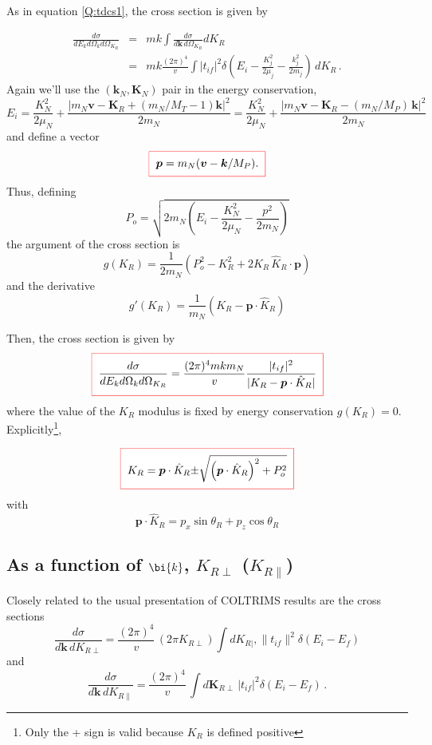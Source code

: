 As in equation \ref{Q:tdcs1}, the cross section is given by

\begin{eqnarray} \label{Q:tdcs2}
\frac{d\sigma}{d E_{k} d\Omega_{k}d \Omega_{K_{R}}} &=& m k
\int
\frac{d\sigma}{d \bm{k} \, d \Omega_{K_{R}} } d K_{R} \\
&=& m k \frac{(2 \pi)^{4}}{v}\int | t_{if}| ^{2}
\delta\left(E_{i} - \frac{K^{2}_{j}} {2 \mu_{j} } - \frac{k^{2}_{j}}{2
m_{j} }\right) \, d K_{R} \, . \nonumber
\end{eqnarray}
%
Again we'll use the $(\bm{k}_N,\bm{K}_N)$ pair in the energy
conservation,
$$
E_{i} = \frac{K^{2}_{N}} {2 \mu_{N} } + \frac{\left| m_N \bm{v} -
\bm{K}_R + (m_N/M_T -1) \bm{k} \right|^{2}}{2 m_N } = \frac{K^{2}_{N}}
{2 \mu_{N} } + \frac{\left| m_N \bm{v} - \bm{K}_R - (m_N/M_P)\, \bm{k}
\right| ^{2}}{2 m_N }
$$
%
and define a vector
$$
\fbeq{\bm{p}=m_{N}(\bm{v} - \bm{k}/M_P).}
$$
%
Thus, defining
$$
P_o = \sqrt{{2 m_N} \left( E_{i} - \frac{K^{2}_{N}} {2 \mu_{N} }-
\frac{p^{2}}{2 m_{N}} \right)}
$$
the argument of the cross section is
$$
g(K_{R}) = \frac{1}{2 m_{N}} \left( P_o^{2} - K_{R}^{2} + 2 K_{R} \,
\hat{K}_{R} \cdot \bm{p} \right)
$$
and the derivative
$$
g'(K_{R}) = \frac{1}{m_{N}} \left(K_{R} - \bm{p} \cdot \hat{K}_{R}
\right)
$$

Then, the cross section is given by
\begin{equation}\label{Q:5xsEkWkWR}
  \fbeq{
\frac{d\sigma}{d E_{k} d\Omega_{k}d \Omega_{K_{R}}} =
\frac{(2 \pi)^{4} m k m_N}{v } \frac{ | t_{if}| ^{2}}{|  K_{R}
- \bm{p} \cdot \hat{K}_{R} | }
    }
\end{equation}
%
where the value of the $K_{R}$ modulus is fixed by energy conservation
$g(K_{R})=0$. Explicitly\footnote{Only the + sign is valid because
$K_{R}$ is defined positive},

\begin{equation}\label{Q:KR-k}
  \fbeq{
K_{R} =  \bm{p}\cdot \hat{K}_{R} {\pm} \sqrt{\left( \bm{p}\cdot \hat{K}_{R}
\right)^{2} + P_o^2}
  }
\end{equation}
%
with
$$
\bm{p}\cdot \hat{K}_{R} = p_{x} \sin{\theta_{R}} + p_{z}
\cos{\theta_{R}}
$$

\newpage
\subsection{As a function of $\bi{k}$, $K_{R \perp}$ ($K_{R \parallel }$)}
Closely related to the usual presentation of COLTRIMS results are the
cross sections
\begin{equation} \label{Q:tdcsxsr0}
\frac{d \sigma}{d \bm{k} \, d K_{R \perp}} = \frac{(2
\pi)^{4}}{v} \,(2 \pi K_{R \perp}) \int d K_{R | }, \parallel
t_{if}\parallel ^{2} \delta \left( E_{i} - E_{f} \right)
\end{equation}
%
and
\begin{equation}\label{Q:5xskR}
\frac{d \sigma}{d \bm{k} \, d K_{R \parallel }} = \frac{(2
\pi)^{4}}{v} \, \int d \bm{K}_{R \perp} \, | t_{if}| ^{2}
\delta \left( E_{i} - E_{f} \right) \, .
\end{equation}



